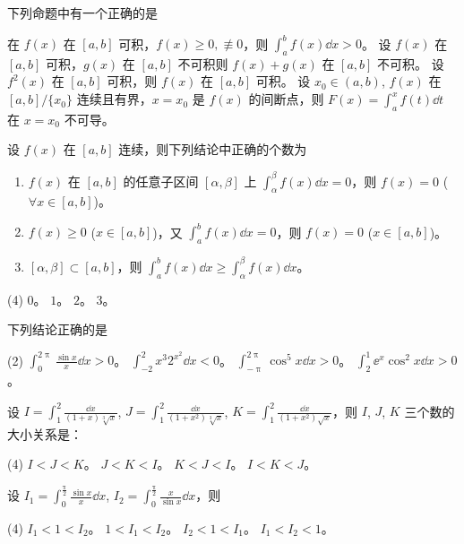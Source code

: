 \begin{ti}
	下列命题中有一个正确的是
	\begin{tasks}
		\task 在 $f(x)$ 在 $[a,b]$ 可积，$f(x) \geq 0, \not\equiv 0$，则 $\int_a^b f(x) \dd{x} > 0$。
		\task 设 $f(x)$ 在 $[a,b]$ 可积，$g(x)$ 在 $[a,b]$ 不可积则 $f(x) + g(x)$ 在 $[a,b]$ 不可积。
		\task 设 $f^2(x)$ 在 $[a,b]$ 可积，则 $f(x)$ 在 $[a,b]$ 可积。
		\task 设 $x_0 \in (a,b)$, $f(x)$ 在 $[a,b]/\{x_0\}$ 连续且有界，$x=x_0$ 是 $f(x)$ 的间断点，则 $F(x) = \int_a^x f(t) \dd{t}$ 在 $x=x_0$ 不可导。
	\end{tasks}
\end{ti}

\begin{ti}
	设 $f(x)$ 在 $[a,b]$ 连续，则下列结论中正确的个数为
	\begin{enumerate}
		\item $f(x)$ 在 $[a,b]$ 的任意子区间 $[\alpha,\beta]$ 上 $\int_\alpha^\beta f(x) \dd{x} = 0$，则 $f(x) = 0$ ($\forall x \in [a,b]$)。
		\item $f(x) \geq 0$ ($x \in [a,b]$)，又 $\int_a^b f(x) \dd{x} = 0$，则 $f(x) = 0$ ($x \in [a,b]$)。
		\item $[\alpha,\beta] \subset [a,b]$，则 $\int_a^b f(x) \dd{x} \geq \int_\alpha^\beta f(x) \dd{x}$。
	\end{enumerate}
	\begin{tasks}(4)
		\task $0$。
		\task $1$。
		\task $2$。
		\task $3$。
	\end{tasks}
\end{ti}

\begin{ti}
	下列结论正确的是
	\begin{tasks}(2)
		\task $\int_0^{2\uppi} \frac{\sin x}{x} \dd{x} > 0$。
		\task $\int_{-2}^2 x^3 2^{x^2} \dd{x} < 0$。
		\task $\int_{-\uppi}^{2\uppi} \cos^5x \dd{x} > 0$。
		\task $\int_2^1 \ee^x \cos^2x \dd{x} > 0$。
	\end{tasks}
\end{ti}

\begin{ti}
	设 $I = \int_1^2 \frac{\dd{x}}{(1+x) \sqrt[3]{x}}$, $J = \int_1^2 \frac{\dd{x}}{(1+x^2) \sqrt[3]{x}}$, $K = \int_1^2 \frac{\dd{x}}{(1+x^2) \sqrt{x}}$，则 $I$, $J$, $K$ 三个数的大小关系是：
	\begin{tasks}(4)
		\task $I < J < K$。
		\task $J < K < I$。
		\task $K < J < I$。
		\task $I < K < J$。
	\end{tasks}
\end{ti}

\begin{ti}
	设 $I_1 = \int_0^{\frac{\uppi}{2}} \frac{\sin x}{x} \dd{x}$, $I_2 = \int_0^{\frac{\uppi}{2}} \frac{x}{\sin x} \dd{x}$，则
	\begin{tasks}(4)
		\task $I_1 < 1 < I_2$。
		\task $1 < I_1 < I_2$。
		\task $I_2 < 1 < I_1$。
		\task $I_1 < I_2 < 1$。
	\end{tasks}
\end{ti}